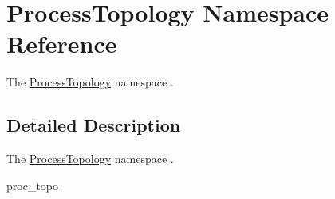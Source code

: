 \hypertarget{namespaceProcessTopology}{}\section{Process\+Topology Namespace Reference}
\label{namespaceProcessTopology}


The \hyperlink{namespaceProcessTopology}{Process\+Topology} namespace .  




\subsection{Detailed Description}
The \hyperlink{namespaceProcessTopology}{Process\+Topology} namespace . 

proc\+\_\+topo 